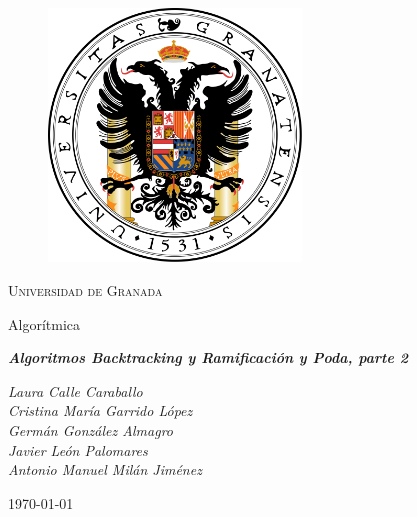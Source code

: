 \documentclass[11pt,a4paper]{article}
\begin{document}
	\begin{titlepage}

		\centering

		\begin{figure}[h]

			\centering
			\includegraphics[width=0.6\textwidth]{logo-ugr.png}
			
		\end{figure}

		\vspace{1cm}

		{\scshape\LARGE Universidad de Granada}

		\vspace{1cm}

		{\LARGE Algorítmica}

		\vspace{1cm}

		{\huge\bfseries\textit{Algoritmos Backtracking y Ramificación y Poda, parte 2}}

		\vspace{1cm}

		{\itshape\large 
		Laura Calle Caraballo \\
		Cristina María Garrido López \\
		Germán González Almagro \\
		Javier León Palomares \\
		Antonio Manuel Milán Jiménez}

		\vfill

		{\Large\today}

	\end{titlepage}

\newpage

	\tableofcontents

\newpage
\end{document}
